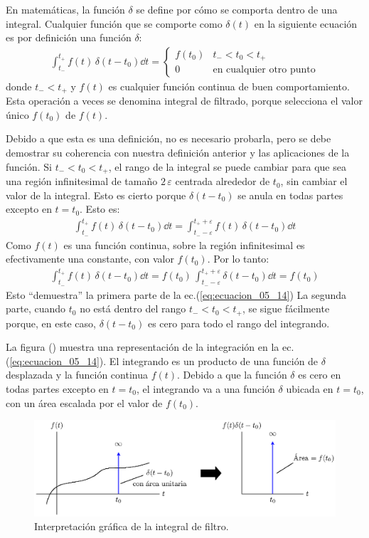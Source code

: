 En matemáticas, la función $\delta$ se define por cómo se comporta dentro de una integral. Cualquier función que se comporte como $\delta (t)$ en la siguiente ecuación es por definición una función $\delta$:
\begin{align}
\int_{t_{-}}^{t_{+}} f(t) \, \delta(t - t_{0}) \dd{t} = \begin{cases}
f(t_{0}) & t_{-} < t_{0}  < t_{+} \\
0 & \mbox{en cualquier otro punto}
\end{cases}
\label{eq:ecuacion_05_14}
\end{align}
donde $t_{-} < t_{+}$ y $f (t)$ es cualquier función continua de buen comportamiento. Esta operación a veces se denomina integral de filtrado, porque selecciona el valor único $f(t_{0})$ de $f(t)$.
\par
Debido a que esta es una definición, no es necesario probarla, pero se debe demostrar su coherencia con nuestra definición anterior y las aplicaciones de la función. Si $t_{-} < t_{0}  < t_{+}$, el rango de la integral se puede cambiar para que sea una región infinitesimal de tamaño $2 \, \varepsilon$ centrada alrededor de $t_{0}$, sin cambiar el valor de la integral. Esto es cierto porque $\delta (t - t_{0})$ se anula en todas partes excepto en $t = t_{0}$. Esto es:
\begin{align}
\int_{t_{-}}^{t_{+}} f(t) \, \delta (t - t_{0}) \dd{t} = \int_{t_{-} - \varepsilon}^{t_{+} + \varepsilon} f(t) \, \delta (t - t_{0}) \dd{t} 
\label{eq:ecuacion_05_15}
\end{align}
Como $f (t)$ es una función continua, sobre la región infinitesimal es efectivamente una constante, con valor $f(t_{0})$. Por lo tanto:
\begin{align}
\int_{t_{-}}^{t_{+}} f(t) \, \delta (t - t_{0}) \dd{t} = f(t_{0}) \, \int_{t_{-} - \varepsilon}^{t_{+} + \varepsilon} \delta (t - t_{0}) \dd{t} = f(t_{0})
\label{eq:ecuacion_05_16}
\end{align}
Esto \enquote{demuestra} la primera parte de la ec.(\ref{eq:ecuacion_05_14}) La segunda parte, cuando $t_{0}$  no está dentro del rango $t_{-} < t_{0}  < t_{+}$, se sigue fácilmente porque, en este caso, $\delta (t - t_{0})$ es cero para todo el rango del integrando.
\par
La figura () muestra una representación de la integración en la ec. (\ref{eq:ecuacion_05_14}). El integrando es un producto de una función de $\delta$ desplazada y la función continua $f (t)$. Debido a que la función $\delta$ es cero en todas partes excepto en $t = t_{0}$, el integrando va a una función $\delta$ ubicada en $t = t_{0}$, con un área escalada por el valor de $f (t_{0})$.
\begin{figure}[H]
    \centering
    \includegraphics[scale=1]{Imagenes/plot_propiedad_desplazamiento.eps}
    \caption{Interpretación gráfica de la integral de filtro.}
    \label{fig:figura_05_10}
\end{figure}



